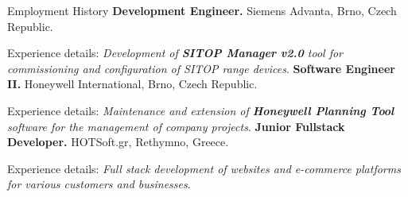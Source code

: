 \begin{rubric}{Employment History}
\entry*[01/2023 -- 09/2024]%
	\textbf{Development Engineer.} Siemens Advanta, Brno, Czech Republic.
	\par Experience details: \emph{Development of \textbf{SITOP Manager v2.0} tool for commissioning and configuration of SITOP range devices}.
	\entry*[10/2021 -- 01/2023]%
	\textbf{Software Engineer II.} Honeywell International, Brno, Czech Republic.
	\par Experience details: \emph{Maintenance and extension of \textbf{Honeywell Planning Tool} software for the management of company projects}.
	\entry*[03/2019 -- 09/2021]%
	\textbf{Junior Fullstack Developer.} HOTSoft.gr, Rethymno, Greece.
	\par Experience details: \emph{Full stack development of websites and e-commerce platforms for various customers and businesses}.
%
\end{rubric}